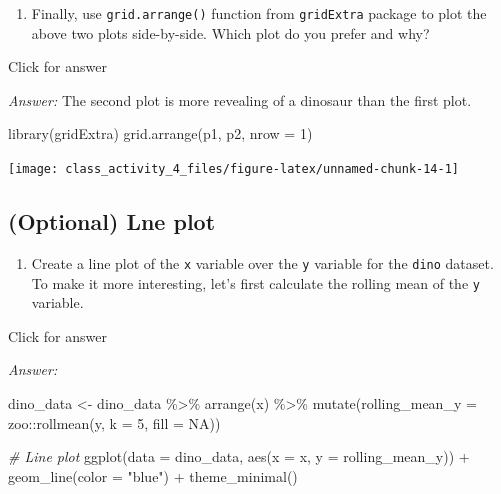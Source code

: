 \documentclass[
]{book}
\newenvironment{Shaded}{\begin{snugshade}}{\end{snugshade}}
\newcommand{\AttributeTok}[1]{\textcolor[rgb]{0.77,0.63,0.00}{#1}}
\newcommand{\CommentTok}[1]{\textcolor[rgb]{0.56,0.35,0.01}{\textit{#1}}}
\newcommand{\ConstantTok}[1]{\textcolor[rgb]{0.00,0.00,0.00}{#1}}
\newcommand{\DecValTok}[1]{\textcolor[rgb]{0.00,0.00,0.81}{#1}}
\newcommand{\FunctionTok}[1]{\textcolor[rgb]{0.00,0.00,0.00}{#1}}
\newcommand{\NormalTok}[1]{#1}
\newcommand{\OtherTok}[1]{\textcolor[rgb]{0.56,0.35,0.01}{#1}}
\newcommand{\SpecialCharTok}[1]{\textcolor[rgb]{0.00,0.00,0.00}{#1}}
\newcommand{\StringTok}[1]{\textcolor[rgb]{0.31,0.60,0.02}{#1}}
\providecommand{\tightlist}{%
  \setlength{\itemsep}{0pt}\setlength{\parskip}{0pt}}
\begin{document}
\begin{enumerate}
\def\labelenumi{\alph{enumi}.}
\setcounter{enumi}{2}
\tightlist
\item
  Finally, use \texttt{grid.arrange()} function from \texttt{gridExtra} package to plot the above two plots side-by-side. Which plot do you prefer and why?
\end{enumerate}

Click for answer

\emph{Answer:} The second plot is more revealing of a dinosaur than the first plot.

\begin{Shaded}
\begin{Highlighting}[]
\FunctionTok{library}\NormalTok{(gridExtra)}
\FunctionTok{grid.arrange}\NormalTok{(p1, p2, }\AttributeTok{nrow =} \DecValTok{1}\NormalTok{)}
\end{Highlighting}
\end{Shaded}

\texttt{[image: class\_activity\_4\_files/figure-latex/unnamed-chunk-14-1]}

\hypertarget{optional-lne-plot}{%
\subsection{(Optional) Lne plot}\label{optional-lne-plot}}

\begin{enumerate}
\def\labelenumi{\alph{enumi}.}
\tightlist
\item
  Create a line plot of the \texttt{x} variable over the \texttt{y} variable for the \texttt{dino} dataset. To make it more interesting, let's first calculate the rolling mean of the \texttt{y} variable.
\end{enumerate}

Click for answer

\emph{Answer:}

\begin{Shaded}
\begin{Highlighting}[]
\NormalTok{dino\_data }\OtherTok{\textless{}{-}}\NormalTok{ dino\_data }\SpecialCharTok{\%\textgreater{}\%}
  \FunctionTok{arrange}\NormalTok{(x) }\SpecialCharTok{\%\textgreater{}\%}
  \FunctionTok{mutate}\NormalTok{(}\AttributeTok{rolling\_mean\_y =}\NormalTok{ zoo}\SpecialCharTok{::}\FunctionTok{rollmean}\NormalTok{(y, }\AttributeTok{k =} \DecValTok{5}\NormalTok{, }\AttributeTok{fill =} \ConstantTok{NA}\NormalTok{))}

\CommentTok{\# Line plot}
\FunctionTok{ggplot}\NormalTok{(}\AttributeTok{data =}\NormalTok{ dino\_data, }\FunctionTok{aes}\NormalTok{(}\AttributeTok{x =}\NormalTok{ x, }\AttributeTok{y =}\NormalTok{ rolling\_mean\_y)) }\SpecialCharTok{+}
  \FunctionTok{geom\_line}\NormalTok{(}\AttributeTok{color =} \StringTok{"blue"}\NormalTok{) }\SpecialCharTok{+}
  \FunctionTok{theme\_minimal}\NormalTok{()}
\end{Highlighting}
\end{Shaded}
\end{document}
